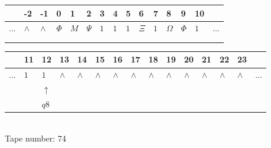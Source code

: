 \documentclass[11pt]{article}
\begin{document}
\begin{table}[H]
\centering
\begin{tabular}{lllllllllllllll}
 & -2 & -1 & 0 & 1 & 2 & 3 & 4 & 5 & 6 & 7 & 8 & 9 & 10 & \\
\hline
$...$ & \multicolumn{1}{|l|}{$\wedge$} & \multicolumn{1}{|l|}{$\wedge$} & \multicolumn{1}{|l|}{$\Phi$} & \multicolumn{1}{|l|}{$M$} & \multicolumn{1}{|l|}{$\Psi$} & \multicolumn{1}{|l|}{$1$} & \multicolumn{1}{|l|}{$1$} & \multicolumn{1}{|l|}{$1$} & \multicolumn{1}{|l|}{$\Xi$} & \multicolumn{1}{|l|}{$1$} & \multicolumn{1}{|l|}{$\Omega$} & \multicolumn{1}{|l|}{$\Phi$} & \multicolumn{1}{|l|}{$1$} & $...$\\
\hline
&  &  &  &  &  &  &  &  &  &  &  &  &  &  \\
&  &  &  &  &  &  &  &  &  &  &  &  &  &  \\
\end{tabular}
\begin{tabular}{lllllllllllllll}
 & 11 & 12 & 13 & 14 & 15 & 16 & 17 & 18 & 19 & 20 & 21 & 22 & 23 & \\
\hline
$...$ & \multicolumn{1}{|l|}{$1$} & \multicolumn{1}{|l|}{$1$} & \multicolumn{1}{|l|}{$\wedge$} & \multicolumn{1}{|l|}{$\wedge$} & \multicolumn{1}{|l|}{$\wedge$} & \multicolumn{1}{|l|}{$\wedge$} & \multicolumn{1}{|l|}{$\wedge$} & \multicolumn{1}{|l|}{$\wedge$} & \multicolumn{1}{|l|}{$\wedge$} & \multicolumn{1}{|l|}{$\wedge$} & \multicolumn{1}{|l|}{$\wedge$} & \multicolumn{1}{|l|}{$\wedge$} & \multicolumn{1}{|l|}{$\wedge$} & $...$\\
\hline
&  & $\uparrow$ &  &  &  &  &  &  &  &  &  &  &  &  \\
&  & $ q8 $ &  &  &  &  &  &  &  &  &  &  &  &  \\
\end{tabular}
\\
Tape number: 74
\noindent\makebox[\linewidth]{\hdashrule{\textwidth}{1pt}{1pt}}\end{table}
\end{document}
